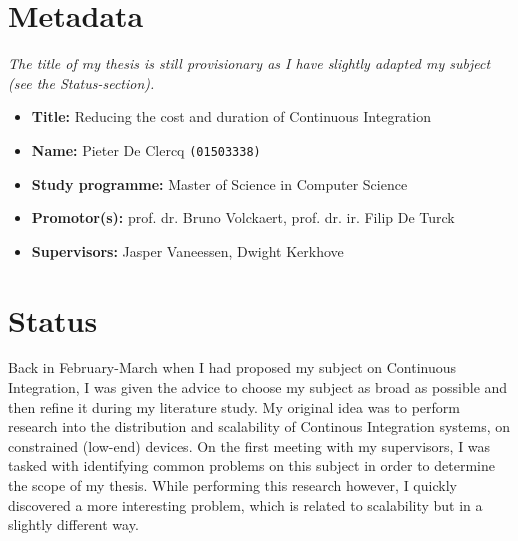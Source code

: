 \newcommand*{\Root}{..}

\renewcommand{\documentdate}{November 2, 2019}
\renewcommand{\documenttitle}{Progress Report 1}


\onehalfspacing
\newpage

\chapter*{Metadata}
\emph{The title of my thesis is still provisionary as I have slightly adapted my subject (see the Status-section).}

\begin{itemize}
  \item \textbf{Title:} Reducing the cost and duration of Continuous Integration
  \item \textbf{Name:} Pieter De Clercq \texttt{(01503338)}
  \item \textbf{Study programme:} Master of Science in Computer Science
  \item \textbf{Promotor(s):} prof. dr. Bruno Volckaert, prof. dr. ir. Filip De Turck
  \item \textbf{Supervisors:} Jasper Vaneessen, Dwight Kerkhove
\end{itemize}

\chapter*{Status}
Back in February-March when I had proposed my subject on Continuous Integration, I was given the advice to choose my subject as broad as possible and then refine it during my literature study. My original idea was to perform research into the distribution and scalability of Continous Integration systems, on constrained (low-end) devices. On the first meeting with my supervisors, I was tasked with identifying common problems on this subject in order to determine the scope of my thesis. While performing this research however, I quickly discovered a more interesting problem, which is related to scalability but in a slightly different way.\\

